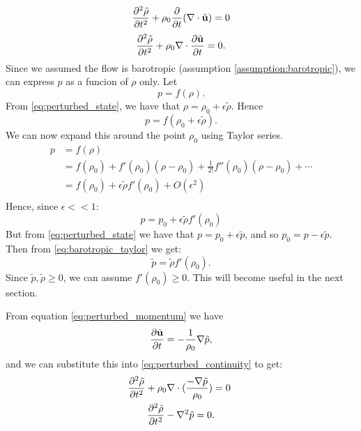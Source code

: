     \begin{equation*}
        \frac{\partial ^2 \tilde{\rho}}{\partial t^2} + \rho_0 \frac{\partial }{\partial t}(\nabla \cdot \tilde{\mathbf{u}}) = 0
    \end{equation*}
    \begin{equation}
        \frac{\partial ^2 \tilde{\rho}}{\partial t^2}
        + \rho_0 \nabla \cdot \frac{\partial \tilde{\mathbf{u}}}{\partial t} = 0.
    \end{equation}
%
Since we assumed the flow is barotropic (assumption \ref{assumption:barotropic}), we can express $p$ as a funcion of $\rho$ only. Let
    \begin{equation}\label{eq:defn_f}
         p = f(\rho).
    \end{equation}
%
From \eqref{eq:perturbed_state}, we have that $\rho = \rho_0 + \epsilon \tilde{\rho}$. Hence
    \begin{equation*}
        p = f(\rho_0 + \epsilon\tilde{\rho}).
    \end{equation*}
%
We can now expand this around the point $\rho_0$ using Taylor series.
    \begin{align*}
        p &= f(\rho) \\
        & = f(\rho_0) + f'(\rho_0)(\rho - \rho_0) + \frac{1}{2!}f''(\rho_0)(\rho - \rho_0) + \dotsb \\
        &= f(\rho_0) + \epsilon \tilde{\rho}f'(\rho_0) + O(\epsilon^2)\\
    \end{align*}
%
Hence, since $\epsilon << 1$:
    \begin{equation}\label{eq:barotropic_taylor}
        p = p_0 + \epsilon \tilde{\rho}f'(\rho_0)
    \end{equation}
%
But from \eqref{eq:perturbed_state} we have that $p = p_0 + \epsilon \tilde{p}$, and so $p_0 = p - \epsilon\tilde{p}$. Then from \eqref{eq:barotropic_taylor} we get:
    \begin{equation}\label{eq:barotropic_condition}
        \tilde{p} = \tilde{\rho} f'(\rho_0).
    \end{equation}
Since $\tilde{p}, \tilde{\rho} \geq 0$, we can assume $f'(\rho_0) \geq 0$. This will become useful in the next section.\par
%
From equation \eqref{eq:perturbed_momentum} we have
\begin{equation*}
    \frac{\partial \tilde{\mathbf{u}}}{\partial t} = - \frac{1}{\rho_0} \nabla \tilde{p},
\end{equation*}
and we can substitute this into \eqref{eq:perturbed_continuity} to get:
\begin{gather*}
    \frac{\partial ^2 \tilde{\rho}}{\partial t^2}
    + \rho_0 \nabla \cdot ( \frac{- \nabla \tilde{p}}{\rho_0}) = 0 ~ \\ \frac{\partial ^2 \tilde{\rho}}{\partial t^2}
    - \nabla^2  \tilde{p} = 0.
\end{gather*}
